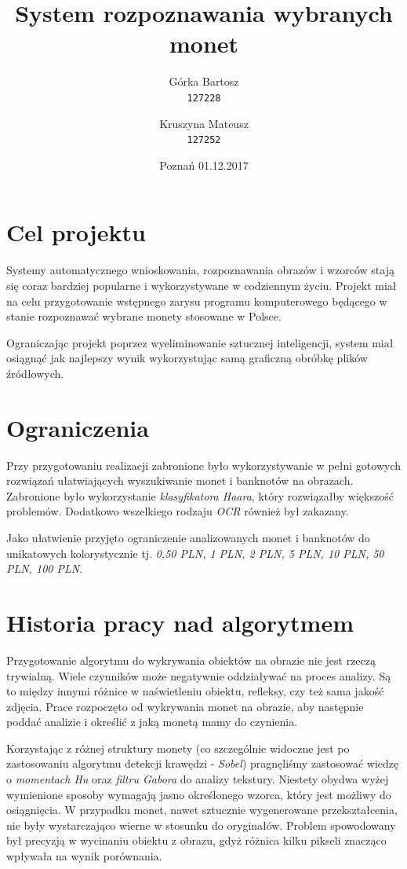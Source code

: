 \documentclass{mwart}
\title{System rozpoznawania wybranych monet}
\author{
    Górka Bartosz\\
  \texttt{127228}
  \and
  Kruszyna Mateusz\\
  \texttt{127252}
}
\date{Poznań 01.12.2017}
\begin{document}
\maketitle

\newpage

\tableofcontents

\newpage

\section{Cel projektu}
Systemy automatycznego wnioskowania, rozpoznawania obrazów i wzorców stają się coraz bardziej popularne i wykorzystywane w codziennym życiu. Projekt miał na celu przygotowanie wstępnego zarysu programu komputerowego będącego w stanie rozpoznawać wybrane monety stosowane w Polsce.

Ograniczając projekt poprzez wyeliminowanie sztucznej inteligencji, system miał osiągnąć jak najlepszy wynik wykorzystując samą graficzną obróbkę plików źródłowych.

\section{Ograniczenia}
Przy przygotowaniu realizacji zabronione było wykorzystywanie w pełni gotowych rozwiązań ułatwiających wyszukiwanie monet i banknotów na obrazach. Zabronione było wykorzystanie \textit{klasyfikatora Haara}, który rozwiązałby większość problemów. Dodatkowo wszelkiego rodzaju \textit{OCR} również był zakazany.

Jako ułatwienie przyjęto ograniczenie analizowanych monet i banknotów do unikatowych kolorystycznie tj. \textit{0,50 PLN, 1 PLN, 2 PLN, 5 PLN, 10 PLN, 50 PLN, 100 PLN}.

\section{Historia pracy nad algorytmem}
Przygotowanie algorytmu do wykrywania obiektów na obrazie nie jest rzeczą trywialną. Wiele czynników może negatywnie oddziaływać na proces analizy. Są to między innymi różnice w naświetleniu obiektu, refleksy, czy też sama jakość zdjęcia.
Prace rozpoczęto od wykrywania monet na obrazie, aby następnie poddać analizie i określić z jaką monetą mamy do czynienia. 

Korzystając z różnej struktury monety (co szczególnie widoczne jest po zastosowaniu algorytmu detekcji krawędzi - \textit{Sobel}) pragnęliśmy zastosować wiedzę o  \textit{momentach Hu} oraz \textit{filtru Gabora} do analizy tekstury.
Niestety obydwa wyżej wymienione sposoby wymagają jasno określonego wzorca, który jest możliwy do osiągnięcia. W przypadku monet, nawet sztucznie wygenerowane przekształcenia, nie były wystarczająco wierne w stosunku do oryginałów. Problem spowodowany był precyzją w wycinaniu obiektu z obrazu, gdyż różnica kilku pikseli znacząco wpływała na wynik porównania.
\end{document}
